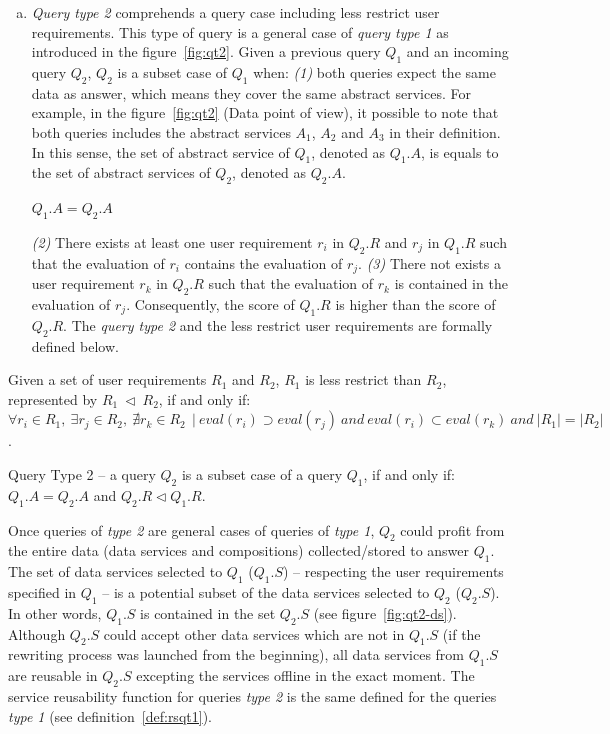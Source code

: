 \begin{enumerate}[b)]
\item \textit{Query type 2} comprehends a query case including less restrict user requirements.  
This type of query is a general case of \textit{query type 1} as introduced in the figure~\ref{fig:qt2}.
Given a previous query $Q_{1}$ and an incoming query $Q_{2}$, $Q_{2}$ is a subset case of $Q_{1}$ when: \textit{(1)} both queries expect the same data as answer, which means they cover the same abstract services. 
For example, in the figure~\ref{fig:qt2} (Data point of view), it possible to note that both queries includes the abstract services $A_{1}$, $A_{2}$ and $A_{3}$ in their definition.
In this sense, the set of abstract service of $Q_{1}$, denoted as $Q_{1}.A$, is equals to the set of abstract services of $Q_{2}$, denoted as $Q_{2}.A$.  
%
\begin{center}
$Q_{1}.A = Q_{2}.A$
\end{center}
%
\textit{(2)} There exists at least one user requirement $r_{i}$ in $Q_{2}.R$ and $r_{j}$ in $Q_{1}.R$ such that the evaluation of $r_{i}$ contains the evaluation of $r_{j}$. 
\textit{(3)} There not exists a user requirement $r_{k}$ in $Q_{2}.R$ such that the evaluation of $r_{k}$ is contained in the evaluation of $r_{j}$.
Consequently, the score of $Q_{1}.R$ is higher than the score of $Q_{2}.R$. 
The \textit{query type 2} and the less restrict user requirements are formally defined below.
\end{enumerate}

\begin{definition}
Given a set of user requirements $R_{1}$ and $R_{2}$, $R_{1}$ is less restrict than $R_{2}$, represented by $R_{1} \ \lhd \ R_{2}$, if and only if: 
$\forall r_{i} \in R_{1}, \ \exists r_{j} \in R_{2}, \ \nexists r_{k} \in R_{2} \ \ \vert \ eval (r_{i}) \supset eval(r_{j}) \ and \ eval (r_{i}) \subset eval(r_{k}) \ and \ \vert R_{1} \vert = \vert R_{2} \vert$.
\end{definition}

\begin{definition}\label{def:qt1}
Query Type 2 -- a query $Q_{2}$ is a subset case of a query $Q_{1}$, if and only if: $Q_{1}.A = Q_{2}.A$ and $Q_{2}.R \lhd Q_{1}.R$.
\end{definition}

Once queries of \textit{type 2} are general cases of queries of \textit{type 1}, $Q_{2}$ could profit from the entire data (data services and compositions) collected/stored to answer $Q_{1}$. 
The set of data services selected to $Q_{1}$ ($Q_{1}.S$) -- respecting the user requirements specified in $Q_{1}$ -- is a potential subset of the data services selected to $Q_{2}$ ($Q_{2}.S$).
In other words, $Q_{1}.S$ is contained in the set $Q_{2}.S$ (see figure~\ref{fig:qt2-ds}).
Although $Q_{2}.S$ could accept other data services which are not in $Q_{1}.S$ (if the rewriting process was launched from the beginning), all data services from $Q_{1}.S$ are reusable in $Q_{2}.S$ excepting the services offline in the exact moment. 
The service reusability function for queries \textit{type 2} is the same defined for the queries \textit{type 1} (see definition~\ref{def:rsqt1}).


